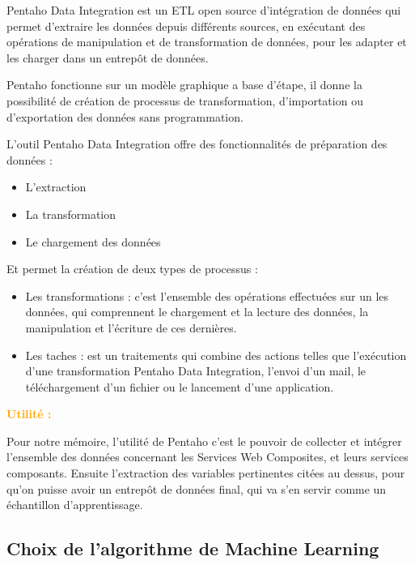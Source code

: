 Pentaho Data Integration est un ETL open source d'intégration de données qui permet d'extraire les données depuis différents sources, en exécutant des opérations de manipulation et de transformation de données, pour les adapter et les charger dans un entrepôt de données.

Pentaho fonctionne sur un modèle graphique a base d'étape, il donne la possibilité de création de processus de transformation, d'importation ou d'exportation des données sans programmation.

L'outil Pentaho Data Integration offre des fonctionnalités de préparation des données : 

\begin{itemize}
    \item L'extraction
    \item La transformation 
    \item Le chargement des données 
\end{itemize}

Et permet la création de deux types de processus : 

\begin{itemize}
    \item Les transformations : c'est l'ensemble des opérations effectuées sur un les données, qui comprennent le chargement et la lecture des données, la manipulation et l'écriture de ces dernières.
    
    \item Les taches :  est un traitements qui combine des actions telles que l'exécution d'une transformation Pentaho Data Integration, l'envoi d'un mail, le téléchargement d'un fichier ou le lancement d'une application.
    
\end{itemize}

\textcolor{Orange}{\textbf{Utilité :}}

Pour notre mémoire, l'utilité de Pentaho c'est le pouvoir de collecter et intégrer l'ensemble des données concernant les Services Web Composites, et leurs services composants. Ensuite l'extraction des variables pertinentes citées au dessus, pour qu'on puisse avoir un entrepôt de données final, qui va s'en servir comme un échantillon d'apprentissage.


\subsection{Choix de l'algorithme de Machine Learning}

